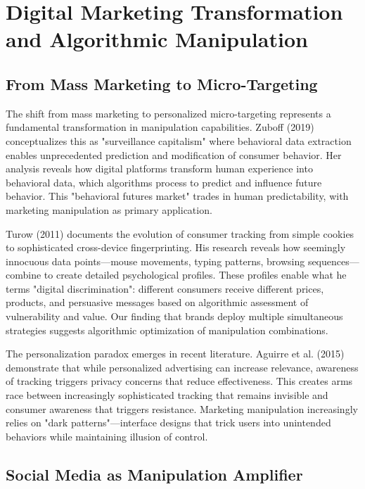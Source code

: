 \section{Digital Marketing Transformation and Algorithmic Manipulation}
\label{sec:digital_lit}

\subsection{From Mass Marketing to Micro-Targeting}

The shift from mass marketing to personalized micro-targeting represents a fundamental transformation in manipulation capabilities. Zuboff (2019) conceptualizes this as "surveillance capitalism" where behavioral data extraction enables unprecedented prediction and modification of consumer behavior. Her analysis reveals how digital platforms transform human experience into behavioral data, which algorithms process to predict and influence future behavior. This "behavioral futures market" trades in human predictability, with marketing manipulation as primary application.

Turow (2011) documents the evolution of consumer tracking from simple cookies to sophisticated cross-device fingerprinting. His research reveals how seemingly innocuous data points—mouse movements, typing patterns, browsing sequences—combine to create detailed psychological profiles. These profiles enable what he terms "digital discrimination": different consumers receive different prices, products, and persuasive messages based on algorithmic assessment of vulnerability and value. Our finding that brands deploy multiple simultaneous strategies suggests algorithmic optimization of manipulation combinations.

The personalization paradox emerges in recent literature. Aguirre et al. (2015) demonstrate that while personalized advertising can increase relevance, awareness of tracking triggers privacy concerns that reduce effectiveness. This creates arms race between increasingly sophisticated tracking that remains invisible and consumer awareness that triggers resistance. Marketing manipulation increasingly relies on "dark patterns"—interface designs that trick users into unintended behaviors while maintaining illusion of control.

\subsection{Social Media as Manipulation Amplifier}

